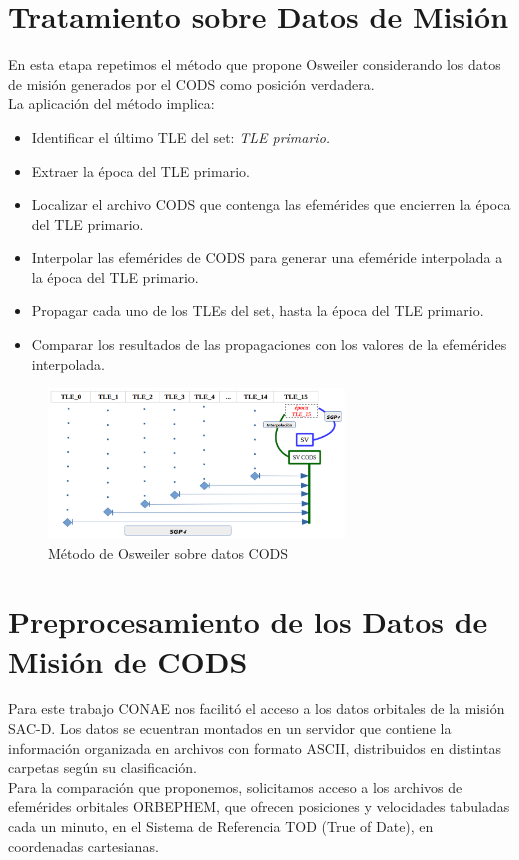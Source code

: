 \section{Tratamiento sobre Datos de Misi\'on}
En esta etapa repetimos el m\'etodo que propone Osweiler considerando los datos de misi\'on generados por el CODS
como posici\'on verdadera.\\
La aplicaci\'on del m\'etodo implica:
\begin{itemize}
 \item Identificar el \'ultimo TLE del set: {\it{TLE primario.}}
 \item Extraer la \'epoca del TLE primario.
 \item Localizar el archivo CODS que contenga las efem\'erides que encierren la \'epoca del TLE primario.
 \item Interpolar las efem\'erides de CODS para generar una efem\'eride interpolada a la \'epoca del TLE primario.
 \item Propagar cada uno de los TLEs del set, hasta la \'epoca del TLE primario.
 \item Comparar los resultados de las propagaciones con los valores de la efem\'erides interpolada.
\end{itemize}

\begin{figure}[!h]
 \centering
 \includegraphics[width=0.7\textwidth]{imagenes/Osweiler_sobre_Cods.png}
 \caption{M\'etodo de Osweiler sobre datos CODS}
\end{figure}

\section{Preprocesamiento de los Datos de Misi\'on de CODS}
Para este trabajo CONAE nos facilit\'o el acceso a los datos orbitales de la misi\'on SAC-D.
Los datos se ecuentran montados en un servidor que contiene la informaci\'on organizada en archivos con formato ASCII, distribuidos en distintas carpetas seg\'un su clasificaci\'on.\\
Para la comparaci\'on que proponemos, solicitamos acceso a los archivos de efem\'erides orbitales ORBEPHEM, que ofrecen posiciones y velocidades tabuladas cada un minuto, en el Sistema de Referencia TOD (True of Date), en coordenadas cartesianas.

